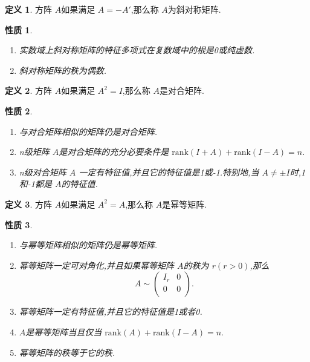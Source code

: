 \documentclass[a4paper,11pt]{article}%
\theoremstyle{remark}
\theoremstyle{definition}
\theoremstyle{definition}
\newtheorem*{definition}{定义}
\theoremstyle{plain}
\newtheorem*{property}{性质}
\begin{document}
\begin{definition}
    方阵 $A$如果满足 $A=-A'$,那么称 $A$为斜对称矩阵.
\end{definition}
\begin{property}
    \begin{enumerate}
        \item 实数域上斜对称矩阵的特征多项式在复数域中的根是0或纯虚数.
        \item 斜对称矩阵的秩为偶数.
    \end{enumerate}
\end{property}

\begin{definition}
    方阵 $A$如果满足 $A^2=I$,那么称 $A$是对合矩阵.
\end{definition}
\begin{property}
\begin{enumerate}
    \item 与对合矩阵相似的矩阵仍是对合矩阵.
    \item n级矩阵 $A$是对合矩阵的充分必要条件是 $\text{rank}(I+A)+\text{rank}(I-A)=n.$
    \item n级对合矩阵 $A$ 一定有特征值,并且它的特征值是1或-1.特别地,当 $A\neq \pm I $时,1和-1都是 $A$的特征值.
\end{enumerate}
\end{property}

\begin{definition}
    方阵 $A$如果满足 $A^2=A$,那么称 $A$是幂等矩阵.
\end{definition}
\begin{property}
    \begin{enumerate}
        \item 与幂等矩阵相似的矩阵仍是幂等矩阵.
        \item 幂等矩阵一定可对角化,并且如果幂等矩阵 $A$的秩为 $r(r>0)$,那么
        \[A\sim \begin{pmatrix}
            I_r&0\\
            0&0\\
        \end{pmatrix}.\]
        \item 幂等矩阵一定有特征值,并且它的特征值是1或者0.
        \item $A$是幂等矩阵当且仅当 $\text{rank}(A)+\text{rank}(I-A)=n.$
    \item 幂等矩阵的秩等于它的秩.
    \end{enumerate}
\end{property}
\end{document}
